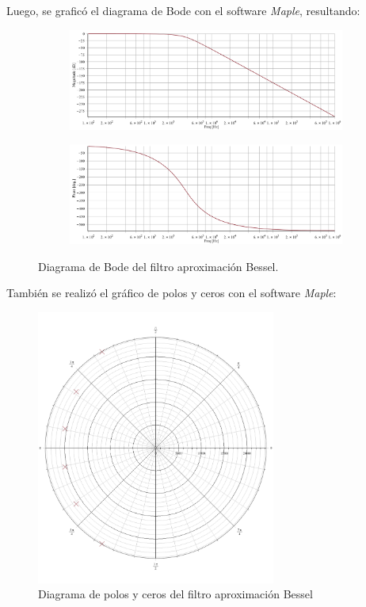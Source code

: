 Luego, se graficó el diagrama de Bode con el software \textit{Maple}, resultando:
\begin{figure}[H]
	\begin{subfigure}{\textwidth}
	\centering
	\includegraphics[width=\textwidth]{Imagenes-Ej1/bessel_hs.png}
	\end{subfigure}
	
	\begin{subfigure}{\textwidth}
	\centering
	\includegraphics[width=\textwidth]{Imagenes-Ej1/bessel_hspha.png}
	\end{subfigure}
	\label{fig:bodebes}
	\caption{Diagrama de Bode del filtro aproximación Bessel.}
\end{figure}
También se realizó el gráfico de polos y ceros con el software \textit{Maple}:

\begin{figure}[H]
\centering
	\centering
	\includegraphics[width=0.7\textwidth]{Imagenes-Ej1/bessel_poles.png}
	\caption{Diagrama de polos y ceros del filtro aproximación Bessel}
	\label{leg_poles}
\end{figure}

